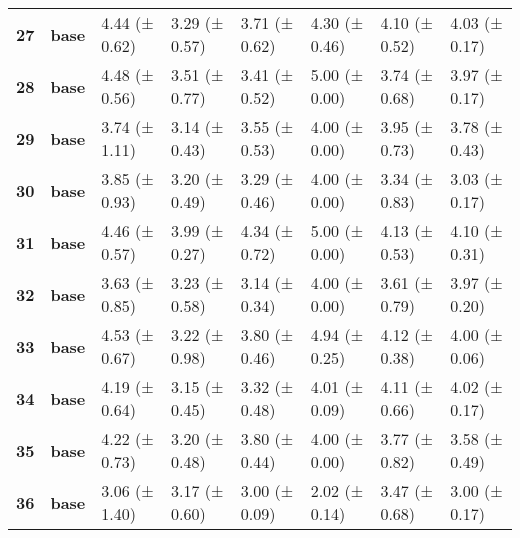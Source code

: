 \begin{longtable}{llllllll}
\cline{1-8}
\textbf{27} & \textbf{base} & 4.44 (± 0.62) & 3.29 (± 0.57) & 3.71 (± 0.62) & 4.30 (± 0.46) & 4.10 (± 0.52) & 4.03 (± 0.17) \\
\cline{1-8}
\textbf{28} & \textbf{base} & 4.48 (± 0.56) & 3.51 (± 0.77) & 3.41 (± 0.52) & 5.00 (± 0.00) & 3.74 (± 0.68) & 3.97 (± 0.17) \\
\cline{1-8}
\textbf{29} & \textbf{base} & 3.74 (± 1.11) & 3.14 (± 0.43) & 3.55 (± 0.53) & 4.00 (± 0.00) & 3.95 (± 0.73) & 3.78 (± 0.43) \\
\cline{1-8}
\textbf{30} & \textbf{base} & 3.85 (± 0.93) & 3.20 (± 0.49) & 3.29 (± 0.46) & 4.00 (± 0.00) & 3.34 (± 0.83) & 3.03 (± 0.17) \\
\cline{1-8}
\textbf{31} & \textbf{base} & 4.46 (± 0.57) & 3.99 (± 0.27) & 4.34 (± 0.72) & 5.00 (± 0.00) & 4.13 (± 0.53) & 4.10 (± 0.31) \\
\cline{1-8}
\textbf{32} & \textbf{base} & 3.63 (± 0.85) & 3.23 (± 0.58) & 3.14 (± 0.34) & 4.00 (± 0.00) & 3.61 (± 0.79) & 3.97 (± 0.20) \\
\cline{1-8}
\textbf{33} & \textbf{base} & 4.53 (± 0.67) & 3.22 (± 0.98) & 3.80 (± 0.46) & 4.94 (± 0.25) & 4.12 (± 0.38) & 4.00 (± 0.06) \\
\cline{1-8}
\textbf{34} & \textbf{base} & 4.19 (± 0.64) & 3.15 (± 0.45) & 3.32 (± 0.48) & 4.01 (± 0.09) & 4.11 (± 0.66) & 4.02 (± 0.17) \\
\cline{1-8}
\textbf{35} & \textbf{base} & 4.22 (± 0.73) & 3.20 (± 0.48) & 3.80 (± 0.44) & 4.00 (± 0.00) & 3.77 (± 0.82) & 3.58 (± 0.49) \\
\cline{1-8}
\textbf{36} & \textbf{base} & 3.06 (± 1.40) & 3.17 (± 0.60) & 3.00 (± 0.09) & 2.02 (± 0.14) & 3.47 (± 0.68) & 3.00 (± 0.17) \\
\cline{1-8}
\end{longtable}
